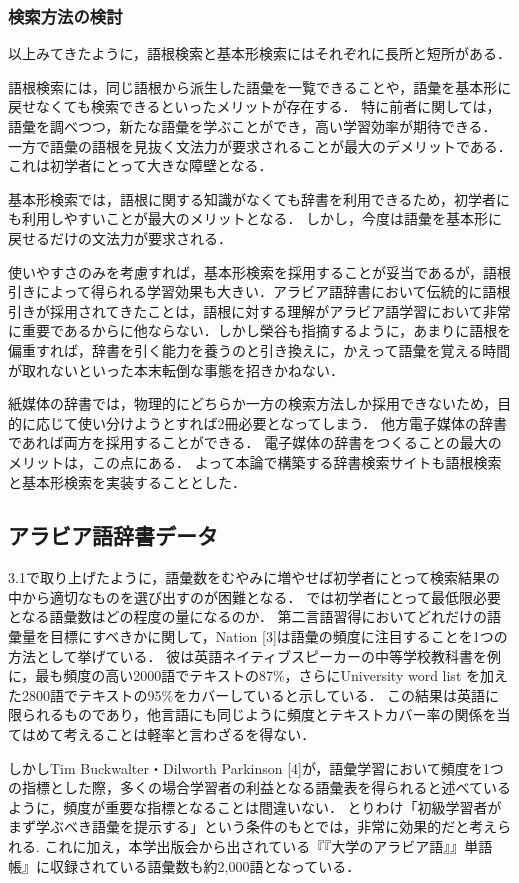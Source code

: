 \documentclass[technicalreport]{ieicej}
\begin{document}
\subsubsection{検索方法の検討}
以上みてきたように，語根検索と基本形検索にはそれぞれに長所と短所がある．

語根検索には，同じ語根から派生した語彙を一覧できることや，語彙を基本形に戻せなくても検索できるといったメリットが存在する．
特に前者に関しては，語彙を調べつつ，新たな語彙を学ぶことができ，高い学習効率が期待できる．
一方で語彙の語根を見抜く文法力が要求されることが最大のデメリットである．
これは初学者にとって大きな障壁となる．

基本形検索では，語根に関する知識がなくても辞書を利用できるため，初学者にも利用しやすいことが最大のメリットとなる．
しかし，今度は語彙を基本形に戻せるだけの文法力が要求される．

使いやすさのみを考慮すれば，基本形検索を採用することが妥当であるが，語根引きによって得られる学習効果も大きい．アラビア語辞書において伝統的に語根引きが採用されてきたことは，語根に対する理解がアラビア語学習において非常に重要であるからに他ならない．しかし榮谷\cite{sakaedani2008}も指摘するように，あまりに語根を偏重すれば，辞書を引く能力を養うのと引き換えに，かえって語彙を覚える時間が取れないといった本末転倒な事態を招きかねない．

紙媒体の辞書では，物理的にどちらか一方の検索方法しか採用できないため，目的に応じて使い分けようとすれば2冊必要となってしまう．
他方電子媒体の辞書であれば両方を採用することができる．
電子媒体の辞書をつくることの最大のメリットは，この点にある．
よって本論で構築する辞書検索サイトも語根検索と基本形検索を実装することとした．

\subsection{アラビア語辞書データ}
3.1で取り上げたように，語彙数をむやみに増やせば初学者にとって検索結果の中から適切なものを選び出すのが困難となる．
では初学者にとって最低限必要となる語彙数はどの程度の量になるのか．
第二言語習得においてどれだけの語彙量を目標にすべきかに関して，Nation [3]は語彙の頻度に注目することを1つの方法として挙げている．
彼は英語ネイティブスピーカーの中等学校教科書を例に，最も頻度の高い2000語でテキストの87\%，さらにUniversity word list を加えた2800語でテキストの95\%をカバーしていると示している．
この結果は英語に限られるものであり，他言語にも同じように頻度とテキストカバー率の関係を当てはめて考えることは軽率と言わざるを得ない．

しかしTim Buckwalter・Dilworth Parkinson [4]が，語彙学習において頻度を1つの指標とした際，多くの場合学習者の利益となる語彙表を得られると述べているように，頻度が重要な指標となることは間違いない．
とりわけ「初級学習者がまず学ぶべき語彙を提示する」という条件のもとでは，非常に効果的だと考えられる.
これに加え，本学出版会から出されている『『大学のアラビア語』』単語帳』に収録されている語彙数も約2,000語となっている．
\end{document}
